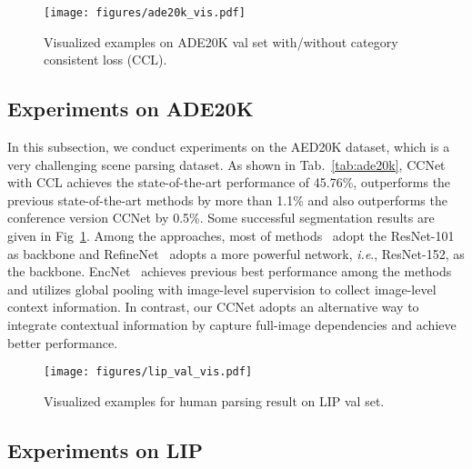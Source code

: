 \documentclass[10pt,journal,compsoc]{IEEEtran}
\def\ie{\emph{i.e}.} \def\Ie{\emph{I.e}.}
\begin{document}
    \begin{figure}[!t]
        \centering
        \texttt{[image: figures/ade20k\_vis.pdf]}
        \caption{Visualized examples on ADE20K val set with/without category consistent loss (CCL).}
        \label{fig:ade20k_vis}
        \vspace{-5mm}
    \end{figure}

\subsection{Experiments on ADE20K}

In this subsection, we conduct experiments on the AED20K dataset, which is a very challenging scene parsing dataset. As shown in Tab.~\ref{tab:ade20k}, CCNet with CCL achieves the state-of-the-art performance of 45.76\%, outperforms the previous state-of-the-art methods by more than 1.1\% and also outperforms the conference version CCNet by 0.5\%. Some successful segmentation results are given in Fig~\ref{fig:ade20k_vis}.
Among the approaches, most of methods~\cite{zhang2017scale, zhao2017pyramid, zhao2018psanet, liang2018dynamic, xiao2018unified, zhang2018context} adopt the ResNet-101 as backbone and RefineNet~\cite{lin2017refinenet} adopts a more powerful network, \ie, ResNet-152, as the backbone. EncNet~\cite{zhang2018context} achieves previous best performance among the methods and utilizes global pooling with image-level supervision to collect image-level context information. In contrast, our CCNet adopts an alternative way to integrate contextual information by capture full-image dependencies and achieve better performance. 

    \begin{figure}[!t]
        \centering
        \texttt{[image: figures/lip\_val\_vis.pdf]}
        \caption{Visualized examples for human parsing result on LIP val set.}
        \label{fig:lip_vis}
        \vspace{-5mm}
    \end{figure}

\subsection{Experiments on LIP}
\end{document}
